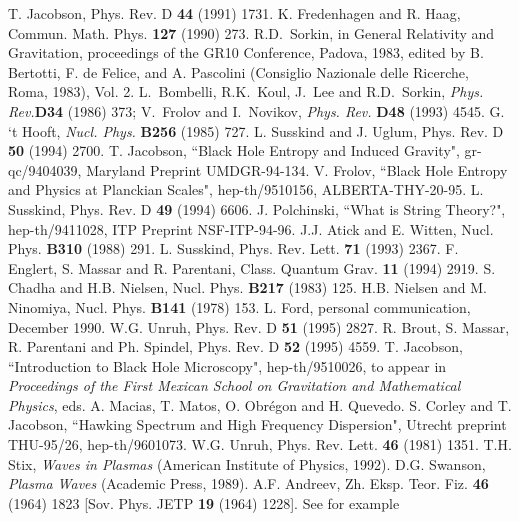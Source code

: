 \documentclass[12pt]{article}
\begin{document}
\begin{thebibliography}{99}
T. Jacobson, {Phys. Rev. D} {\bf 44} (1991) 1731.
K. Fredenhagen and R. Haag, Commun. Math. Phys. {\bf 127}
(1990) 273.
R.D.~Sorkin, in General Relativity and Gravitation, proceedings 
of the GR10 Conference, Padova, 1983, edited by B. Bertotti, F. de Felice, and A. Pascolini (Consiglio Nazionale delle Ricerche, Roma, 1983), Vol. 2.
L.~Bombelli, R.K.~Koul, J.~Lee and R.D.~Sorkin, {\sl Phys. Rev.}{\bf D34} (1986) 373;
V.~Frolov and I.~Novikov, {\sl Phys. Rev.} {\bf D48} (1993) 4545.
G. `t Hooft, {\it Nucl. Phys.} {\bf B256} (1985) 727. 
L. Susskind and J. Uglum, Phys. Rev. D {\bf 50} (1994) 2700.
T. Jacobson, ``Black Hole Entropy and Induced Gravity",
gr-qc/9404039, Maryland Preprint UMDGR-94-134.
V. Frolov, ``Black Hole Entropy and Physics at Planckian Scales", hep-th/9510156, ALBERTA-THY-20-95.
L. Susskind, Phys. Rev. D {\bf 49} (1994) 6606.
J. Polchinski, ``What is String Theory?", hep-th/9411028,
ITP Preprint NSF-ITP-94-96.
J.J. Atick and E. Witten, Nucl. Phys. {\bf B310} (1988) 291.
L. Susskind, Phys. Rev. Lett. {\bf 71} (1993) 2367.
F. Englert, S. Massar and R. Parentani, Class. Quantum Grav.
{\bf 11} (1994) 2919.
S. Chadha and H.B. Nielsen, Nucl. Phys. {\bf B217} (1983) 125.
H.B. Nielsen and M. Ninomiya, Nucl. Phys. {\bf B141} (1978)
153.
L. Ford, personal communication, December 1990.
W.G. Unruh, {Phys. Rev. D} {\bf 51} (1995) 2827. 
R. Brout, S. Massar, R. Parentani and Ph. Spindel,
{Phys. Rev. D} {\bf 52} (1995) 4559.
T. Jacobson, ``Introduction to Black Hole Microscopy",
hep-th/9510026, to appear in {\it Proceedings of the First Mexican School
on Gravitation and Mathematical Physics}, eds. A. Macias, T. Matos, 
O. Obr\'egon and H. Quevedo.
S. Corley and T. Jacobson, ``Hawking Spectrum
and High Frequency Dispersion", Utrecht preprint THU-95/26, hep-th/9601073.
W.G. Unruh, {Phys. Rev. Lett.} {\bf 46} (1981) 1351.
T.H. Stix, {\it Waves in Plasmas} 
(American Institute of Physics, 1992).
D.G. Swanson, {\it Plasma Waves} (Academic Press, 1989).
A.F. Andreev, Zh. Eksp. Teor. Fiz. {\bf 46} (1964) 1823 [Sov. Phys. JETP {\bf 19} (1964) 1228].
See for example 

\end{thebibliography}
\end{document}
